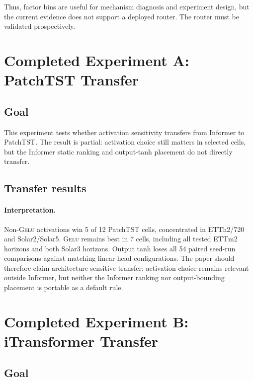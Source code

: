 \documentclass{article}
\newcommand{\gelu}{\textsc{Gelu}}
\newcommand{\patchtst}{PatchTST}
\begin{document}


Thus, factor bins are useful for mechanism diagnosis and experiment design, but the current evidence does not support a deployed router. The router must be validated prospectively.

\section{Completed Experiment A: PatchTST Transfer}

\subsection{Goal}

This experiment tests whether activation sensitivity transfers from Informer to \patchtst{}. The result is partial: activation choice still matters in selected cells, but the Informer static ranking and output-tanh placement do not directly transfer.

\subsection{Transfer results}





\paragraph{Interpretation.}
Non-\gelu{} activations win 5 of 12 \patchtst{} cells, concentrated in ETTh2/720 and Solar2/Solar5. \gelu{} remains best in 7 cells, including all tested ETTm2 horizons and both Solar3 horizons. Output tanh loses all 54 paired seed-run comparisons against matching linear-head configurations. The paper should therefore claim architecture-sensitive transfer: activation choice remains relevant outside Informer, but neither the Informer ranking nor output-bounding placement is portable as a default rule.

\section{Completed Experiment B: iTransformer Transfer}

\subsection{Goal}
\end{document}

